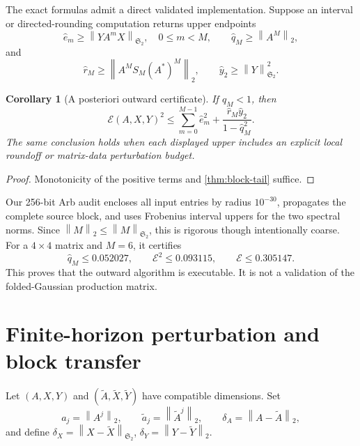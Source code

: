 \documentclass[11pt]{article}
\newtheorem{corollary}[theorem]{Corollary}
\theoremstyle{remark}
\newcommand{\cE}{\mathcal E}
\newcommand{\HS}{\mathfrak S_2}
\newcommand{\norm}[1]{\left\lVert #1\right\rVert}
\begin{document}
The exact formulas admit a direct validated implementation.  Suppose an
interval or directed-rounding computation returns upper endpoints
\[
 \widehat e_m\ge\norm{YA^mX}_{\HS},\quad 0\le m<M,
 \qquad
 \widehat q_M\ge\norm{A^M}_2,
\]
and
\[
 \widehat r_M\ge\norm{A^MS_M(A^*)^M}_2,
 \qquad
 \widehat y_2\ge\norm Y_{\HS}^2.
\]

\begin{corollary}[A posteriori outward certificate]
\label{cor:outward}
If \(\widehat q_M<1\), then
\begin{equation}
 \cE(A,X,Y)^2
 \le
 \sum_{m=0}^{M-1}\widehat e_m^2
 +\frac{\widehat r_M\widehat y_2}{1-\widehat q_M^2}.
 \label{eq:outward}
\end{equation}
The same conclusion holds when each displayed upper includes an explicit
local roundoff or matrix-data perturbation budget.
\end{corollary}

\begin{proof}
Monotonicity of the positive terms and \cref{thm:block-tail} suffice.
\end{proof}

Our 256-bit Arb audit encloses all input entries by radius \(10^{-30}\),
propagates the complete source block, and uses Frobenius interval uppers for
the two spectral norms.  Since \(\norm M_2\le\norm M_{\HS}\), this is
rigorous though intentionally coarse.  For a \(4\times4\) matrix and
\(M=6\), it certifies
\[
 \widehat q_M\le0.052027,\qquad
 \cE^2\le0.093115,\qquad
 \cE\le0.305147.
\]
This proves that the outward algorithm is executable.  It is not a
validation of the folded-Gaussian production matrix.

\section{Finite-horizon perturbation and block transfer}
\label{sec:perturbation}

Let \((A,X,Y)\) and
\((\widetilde A,\widetilde X,\widetilde Y)\) have compatible dimensions.
Set
\[
 a_j=\norm{A^j}_2,
 \qquad \widetilde a_j=\norm{\widetilde A^j}_2,
 \qquad \delta_A=\norm{A-\widetilde A}_2,
\]
and define \(\delta_X=\norm{X-\widetilde X}_{\HS}\),
\(\delta_Y=\norm{Y-\widetilde Y}_2\).
\end{document}
